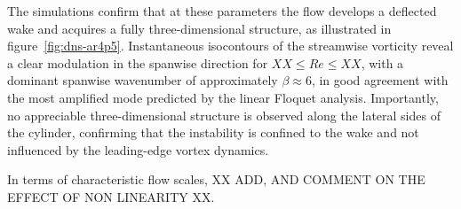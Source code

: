 The simulations confirm that at these parameters the flow develops a deflected wake and acquires a fully three-dimensional structure, as illustrated in figure~\ref{fig:dns-ar4p5}. Instantaneous isocontours of the streamwise vorticity reveal a clear modulation in the spanwise direction for $ XX \le Re \le XX $, with a dominant spanwise wavenumber of approximately $\beta \approx 6$, in good agreement with the most amplified mode predicted by the linear Floquet analysis. Importantly, no appreciable three-dimensional structure is observed along the lateral sides of the cylinder, confirming that the instability is confined to the wake and not influenced by the leading-edge vortex dynamics.

In terms of characteristic flow scales, XX ADD, AND COMMENT ON THE EFFECT OF NON LINEARITY XX.

